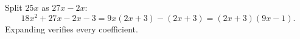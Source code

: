 Split $25x$ as $27x-2x$:
\[18x^2+27x-2x-3=9x(2x+3)-(2x+3)=\boxed{(2x+3)(9x-1)}.\]
Expanding verifies every coefficient.
